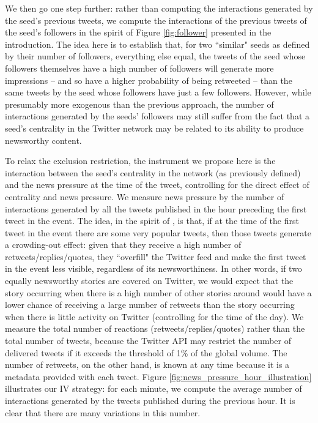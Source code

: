 We then go one step further: rather than computing the interactions generated by the seed's previous tweets, we compute the interactions of the previous tweets of the seed's followers in the spirit of Figure \ref{fig:follower} presented in the introduction. The idea here is to establish that, for two ``similar" seeds as defined by their number of followers, everything else equal, the tweets of the seed whose followers themselves have a high number of followers will generate more impressions -- and so have a higher probability of being retweeted -- than the same tweets by the seed whose followers have just a few followers. However, while presumably more exogenous than the previous approach, the number of interactions generated by the seeds' followers may still suffer from the fact that a seed's centrality in the Twitter network may be related to its ability to produce newsworthy content. 

To relax the exclusion restriction, the instrument we propose here is the interaction between the seed's centrality in the network (as previously defined) and the news pressure at the time of the tweet, controlling for the direct effect of centrality and news pressure. We measure news pressure by the number of interactions generated by all the tweets published in the hour preceding the first tweet in the event. The idea, in the spirit of \citet{EisenseeStromberg2007}, is that, if at the time of the first tweet in the event there are some very popular tweets, then those tweets generate a crowding-out effect: given that they receive a high number of retweets/replies/quotes, they ``overfill" the Twitter feed and make the first tweet in the event less visible, regardless of its newsworthiness. In other words, if two equally newsworthy stories are covered on Twitter, we would expect that the story occurring when there is a high number of other stories around would have a lower chance of receiving a large number of retweets than the story occurring when there is little activity on Twitter (controlling for the time of the day). We measure the total number of reactions (retweets/replies/quotes) rather than the total number of tweets, because the Twitter API may restrict the number of delivered tweets if it exceeds the threshold of 1\% of the global volume. The number of retweets, on the other hand, is known at any time because it is a metadata provided with each tweet. Figure \ref{fig:news_pressure_hour_illustration} illustrates our IV strategy: for each minute, we compute the average number of interactions generated by the tweets published during the previous hour. It is clear that there are many variations in this number.


